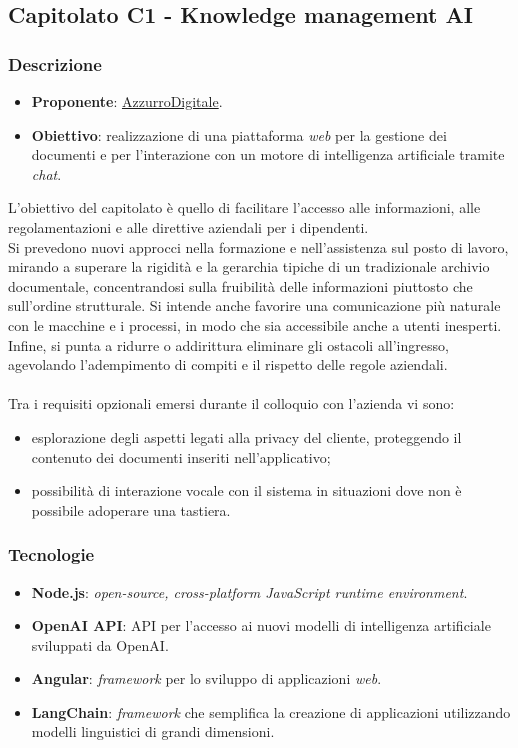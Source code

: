 \subsection{Capitolato C1 - Knowledge management AI}


\subsubsection{Descrizione}
\begin{itemize}
    \item \textbf{Proponente}: \href{https://www.azzurrodigitale.com/}{AzzurroDigitale}.
    \item \textbf{Obiettivo}: realizzazione di una piattaforma \textit{web} per la gestione dei documenti e per l'interazione con un motore di intelligenza artificiale tramite \textit{chat}.
\end{itemize}
L'obiettivo del capitolato è quello di facilitare l'accesso alle informazioni, alle regolamentazioni e alle direttive aziendali per i dipendenti.\\ 
Si prevedono nuovi approcci nella formazione e nell'assistenza sul posto di lavoro, mirando a superare la rigidità e la gerarchia tipiche di un tradizionale archivio documentale, concentrandosi sulla fruibilità delle informazioni piuttosto che sull'ordine strutturale. 
Si intende anche favorire una comunicazione più naturale con le macchine e i processi, in modo che sia accessibile anche a utenti inesperti. 
Infine, si punta a ridurre o addirittura eliminare gli ostacoli all'ingresso, agevolando l'adempimento di compiti e il rispetto delle regole aziendali. \\
\\
\noindent
Tra i requisiti opzionali emersi durante il colloquio con l'azienda vi sono:
\begin{itemize}
    \item esplorazione degli aspetti legati alla privacy del cliente, proteggendo il contenuto dei documenti inseriti nell'applicativo;
    \item possibilità di interazione vocale con il sistema in situazioni dove non è possibile adoperare una tastiera.
\end{itemize}

\subsubsection{Tecnologie}
\begin{itemize}
    \item \textbf{Node.js}: \textit{open-source, cross-platform JavaScript runtime environment}.
    \item \textbf{OpenAI API}: API per l'accesso ai nuovi modelli di intelligenza artificiale sviluppati da OpenAI.
    \item \textbf{Angular}: \textit{framework} per lo sviluppo di applicazioni \textit{web}.
    \item \textbf{LangChain}: \textit{framework} che semplifica la creazione di applicazioni utilizzando modelli linguistici di grandi dimensioni.
\end{itemize}


